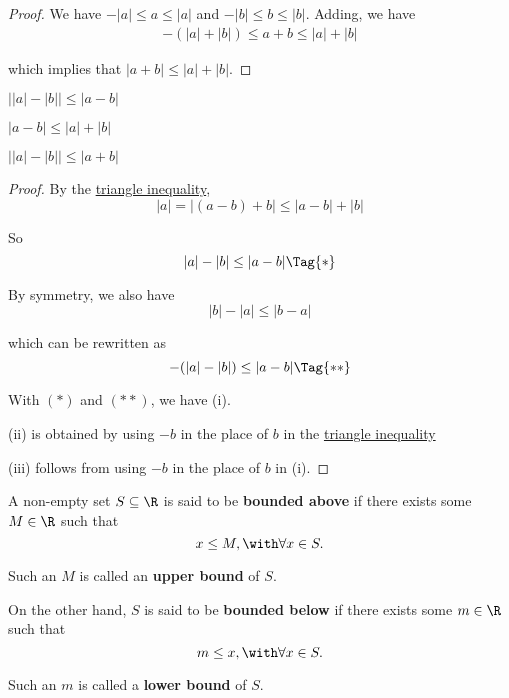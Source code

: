 \begin{proof}
  We have $-|a|\leq a\leq|a|$ and $-|b|\leq b\leq|b|$. Adding, we have
  \begin{align*}
    -(|a|+|b|)\leq a+b\leq |a|+|b|
  \end{align*}

  which implies that $|a+b|\leq|a|+|b|$.
\end{proof}

\label{f699f4d}

\begin{enumerati}
  \item $\big||a|-|b|\big|\leq|a-b|$
  \item $|a-b|\leq|a|+|b|$
  \item $\big||a|-|b|\big|\leq|a+b|$
\end{enumerati}

\begin{proof}
  By the \href{f1288ad}{triangle inequality},
  $$
    |a|=|(a-b)+b|\leq|a-b|+|b|
  $$

  So
  \begin{equation*}
    |a|-|b|\leq|a-b|\Tag{*}
  \end{equation*}

  By symmetry, we also have
  $$
    |b|-|a|\leq|b-a|
  $$

  which can be rewritten as
  \begin{equation*}
    -(|a|-|b|)\leq|a-b|\Tag{**}
  \end{equation*}

  With $(*)$ and $(**)$, we have (i).

  (ii) is obtained by using $-b$ in the place of $b$ in the
  \href{f1288ad}{triangle inequality}

  (iii) follows from using $-b$ in the place of $b$ in (i).
\end{proof}

\label{e4698be}

A non-empty set $S\subseteq\R$ is said to be \textbf{bounded above} if there
exists some $M\in\R$ such that
$$
  x\leq M,\with\forall x\in S.
$$

Such an $M$ is called an \textbf{upper bound} of $S$.

On the other hand, $S$ is said to be \textbf{bounded below} if there exists
some $m\in\R$ such that
$$
  m\leq x,\with\forall x\in S.
$$

Such an $m$ is called a \textbf{lower bound} of $S$.

